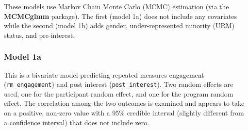 \documentclass[man]{apa6}
\theoremstyle{definition}
\theoremstyle{definition}
\theoremstyle{definition}
\theoremstyle{remark}
\begin{document}
These models use Markov Chain Monte Carlo (MCMC) estimation (via the
\textbf{MCMCglmm} package). The first (model 1a) does not include any
covariates while the second (model 1b) adds gender, under-represented
minority (URM) status, and pre-interest.

\subsubsection{Model 1a}\label{model-1a}

This is a bivariate model predicting repeated measures engagement
(\texttt{rm\_engagement}) and post interest (\texttt{post\_interest}).
Two random effects are used, one for the participant random effect, and
one for the program random effect. The correlation among the two
outcomes is examined and appears to take on a positive, non-zero value
with a 95\% credible interval (slightly different from a confidence
interval) that does not include zero.
\end{document}
